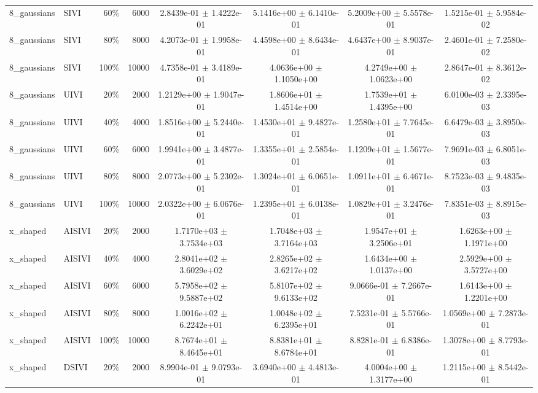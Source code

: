 \begin{tabular}{llrrcccc}
8\_gaussians & SIVI & 60\% & 6000 & 2.8439e-01 $\pm$ 1.4222e-01 & 5.1416e+00 $\pm$ 6.1410e-01 & 5.2009e+00 $\pm$ 5.5578e-01 & 1.5215e-01 $\pm$ 5.9584e-02 \\
8\_gaussians & SIVI & 80\% & 8000 & 4.2073e-01 $\pm$ 1.9958e-01 & 4.4598e+00 $\pm$ 8.6434e-01 & 4.6437e+00 $\pm$ 8.9037e-01 & 2.4601e-01 $\pm$ 7.2580e-02 \\
8\_gaussians & SIVI & 100\% & 10000 & 4.7358e-01 $\pm$ 3.4189e-01 & 4.0636e+00 $\pm$ 1.1050e+00 & 4.2749e+00 $\pm$ 1.0623e+00 & 2.8647e-01 $\pm$ 8.3612e-02 \\
8\_gaussians & UIVI & 20\% & 2000 & 1.2129e+00 $\pm$ 1.9047e-01 & 1.8606e+01 $\pm$ 1.4514e+00 & 1.7539e+01 $\pm$ 1.4395e+00 & 6.0100e-03 $\pm$ 2.3395e-03 \\
8\_gaussians & UIVI & 40\% & 4000 & 1.8516e+00 $\pm$ 5.2440e-01 & 1.4530e+01 $\pm$ 9.4827e-01 & 1.2580e+01 $\pm$ 7.7645e-01 & 6.6479e-03 $\pm$ 3.8950e-03 \\
8\_gaussians & UIVI & 60\% & 6000 & 1.9941e+00 $\pm$ 3.4877e-01 & 1.3355e+01 $\pm$ 2.5854e-01 & 1.1209e+01 $\pm$ 1.5677e-01 & 7.9691e-03 $\pm$ 6.8051e-03 \\
8\_gaussians & UIVI & 80\% & 8000 & 2.0773e+00 $\pm$ 5.2302e-01 & 1.3024e+01 $\pm$ 6.0651e-01 & 1.0911e+01 $\pm$ 6.4671e-01 & 8.7523e-03 $\pm$ 9.4835e-03 \\
8\_gaussians & UIVI & 100\% & 10000 & 2.0322e+00 $\pm$ 6.0676e-01 & 1.2395e+01 $\pm$ 6.0138e-01 & 1.0829e+01 $\pm$ 3.2476e-01 & 7.8351e-03 $\pm$ 8.8915e-03 \\
x\_shaped & AISIVI & 20\% & 2000 & 1.7170e+03 $\pm$ 3.7534e+03 & 1.7048e+03 $\pm$ 3.7164e+03 & 1.9547e+01 $\pm$ 3.2506e+01 & 1.6263e+00 $\pm$ 1.1971e+00 \\
x\_shaped & AISIVI & 40\% & 4000 & 2.8041e+02 $\pm$ 3.6029e+02 & 2.8265e+02 $\pm$ 3.6217e+02 & 1.6434e+00 $\pm$ 1.0137e+00 & 2.5929e+00 $\pm$ 3.5727e+00 \\
x\_shaped & AISIVI & 60\% & 6000 & 5.7958e+02 $\pm$ 9.5887e+02 & 5.8107e+02 $\pm$ 9.6133e+02 & 9.0666e-01 $\pm$ 7.2667e-01 & 1.6143e+00 $\pm$ 1.2201e+00 \\
x\_shaped & AISIVI & 80\% & 8000 & 1.0016e+02 $\pm$ 6.2242e+01 & 1.0048e+02 $\pm$ 6.2395e+01 & 7.5231e-01 $\pm$ 5.5766e-01 & 1.0569e+00 $\pm$ 7.2873e-01 \\
x\_shaped & AISIVI & 100\% & 10000 & 8.7674e+01 $\pm$ 8.4645e+01 & 8.8381e+01 $\pm$ 8.6784e+01 & 8.8281e-01 $\pm$ 6.8386e-01 & 1.3078e+00 $\pm$ 8.7793e-01 \\
x\_shaped & DSIVI & 20\% & 2000 & 8.9904e-01 $\pm$ 9.0793e-01 & 3.6940e+00 $\pm$ 4.4813e-01 & 4.0004e+00 $\pm$ 1.3177e+00 & 1.2115e+00 $\pm$ 8.5442e-01 \\

\end{tabular}
